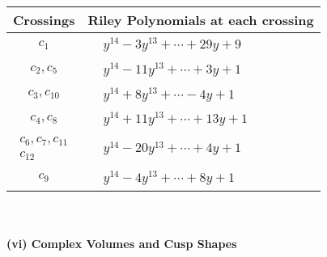 \documentclass[1p]{elsarticle_modified}
\theoremstyle{definition}
\begin{document}
\begin{tabular}{m{50pt}|m{274pt}}
Crossings & \hspace{64pt}Riley Polynomials at each crossing \\
\hline $$\begin{aligned}c_{1}\end{aligned}$$&$\begin{aligned}
&y^{14}-3 y^{13}+\cdots+29 y+9
\end{aligned}$\\
\hline $$\begin{aligned}c_{2},c_{5}\end{aligned}$$&$\begin{aligned}
&y^{14}-11 y^{13}+\cdots+3 y+1
\end{aligned}$\\
\hline $$\begin{aligned}c_{3},c_{10}\end{aligned}$$&$\begin{aligned}
&y^{14}+8 y^{13}+\cdots-4 y+1
\end{aligned}$\\
\hline $$\begin{aligned}c_{4},c_{8}\end{aligned}$$&$\begin{aligned}
&y^{14}+11 y^{13}+\cdots+13 y+1
\end{aligned}$\\
\hline $$\begin{aligned}c_{6},c_{7},c_{11}\\c_{12}\end{aligned}$$&$\begin{aligned}
&y^{14}-20 y^{13}+\cdots+4 y+1
\end{aligned}$\\
\hline $$\begin{aligned}c_{9}\end{aligned}$$&$\begin{aligned}
&y^{14}-4 y^{13}+\cdots+8 y+1
\end{aligned}$\\
\hline
\end{tabular}\\~\\
\newpage\flushleft \textbf{(vi) Complex Volumes and Cusp Shapes}
\end{document}
